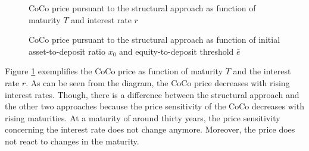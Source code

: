 \begin{figure}[H]
\centering
    \caption[CoCo price pursuant to the structural approach as function of maturity and interest rate]{CoCo price pursuant to the structural approach as function of maturity $T$ and interest rate $r$}
  \label{fig:sa2}
  \end{figure}

\begin{figure}[H]
\centering
    \caption[CoCo price pursuant to the structural approach as function of asset-to-deposit ratio and equity-to-deposit threshold]{CoCo price pursuant to the structural approach as function of initial asset-to-deposit ratio $x_0$ and equity-to-deposit threshold $\bar{e}$}
  \label{fig:sa3}
  \end{figure}

Figure \ref{fig:sa2} exemplifies the CoCo price as function of maturity $T$ and the interest rate $r$. As can be seen from the diagram, the CoCo price decreases with rising interest rates. Though, there is a difference between the structural approach and the other two approaches because the price sensitivity of the CoCo decreases with rising maturities. At a maturity of around thirty years, the price sensitivity concerning the interest rate does not change anymore. Moreover, the price does not react to changes in the maturity.\\

